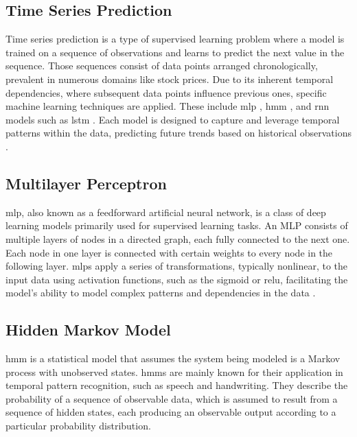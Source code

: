\subsection{Time Series Prediction}

Time series prediction is a type of supervised learning problem where a model is trained on a sequence of observations and learns to predict the next value in the sequence.
Those sequences consist of data points arranged chronologically, prevalent in numerous domains like stock prices.
Due to its inherent temporal dependencies, where subsequent data points influence previous ones, specific machine learning techniques are applied.
These include \ac{mlp} \cite{mlp-backpropagation-rumelhart}, \ac{hmm} \cite{hmm-rabiner-1989}, and \ac{rnn} \cite{hopfield-rnn} models such as \ac{lstm} \cite{lstm-hochreiter}.
Each model is designed to capture and leverage temporal patterns within the data, predicting future trends based on historical observations \cite{neptune-ai}.


\subsection{Multilayer Perceptron}

\ac{mlp}, also known as a feedforward artificial neural network, is a class of deep learning models primarily used for supervised learning tasks.
An MLP consists of multiple layers of nodes in a directed graph, each fully connected to the next one.
Each node in one layer is connected with certain weights to every node in the following layer.
\acp{mlp} apply a series of transformations, typically nonlinear, to the input data using activation functions, such as the sigmoid or \ac{relu}, facilitating the model's ability to model complex patterns and dependencies in the data \cite{goodfellow_deep_2016}.

\subsection{Hidden Markov Model}

\ac{hmm} is a statistical model that assumes the system being modeled is a Markov process with unobserved states.
\acp{hmm} are mainly known for their application in temporal pattern recognition, such as speech and handwriting.
They describe the probability of a sequence of observable data, which is assumed to result from a sequence of hidden states, each producing an observable output according to a particular probability distribution.

